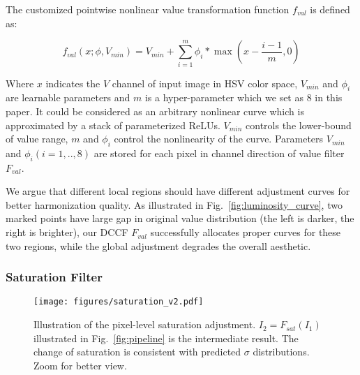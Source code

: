 \documentclass[runningheads]{llncs}
\begin{document}
    
    The customized pointwise nonlinear value transformation function $f_{val}$ is defined as:
     
    \begin{equation} \label{eq:f_lum}
        f_{val}(x;\phi,V_{min}) = V_{min} + \sum_{i=1}^{m} \phi_i * \max(x - \frac{i-1}{m}, 0)
    \end{equation}
    
    Where $x$ indicates the $V$ channel of input image in HSV color space,  $V_{min}$ and $\phi_i$ are learnable parameters and $m$ is a hyper-parameter which we set as 8 in this paper.
    It could be considered as an arbitrary nonlinear curve which is approximated by a stack of parameterized ReLUs.
    $V_{min}$ controls the lower-bound of value range, $m$ and $\phi_i$ control the nonlinearity of the curve.
    Parameters $V_{min}$ and $\phi_i (i=1,..,8)$ are stored for each pixel in channel direction of value filter $F_{val}$.
    


    We argue that different local regions should have different adjustment curves for better harmonization quality.
    As illustrated in Fig.~\ref{fig:luminosity_curve}, two marked points have large gap in original value distribution (the left is darker, the right is brighter), our DCCF $F_{val}$ successfully allocates proper curves for these two regions, while the global adjustment degrades the overall aesthetic.
    


    
\subsubsection{Saturation Filter} 
    
    \begin{figure}[!thb]
        \centering
        \vspace{-30pt}
        \texttt{[image: figures/saturation\_v2.pdf]}\\
        \caption{
            \small Illustration of the pixel-level saturation adjustment. 
            $I_2=F_{sat}(I_1)$ illustrated in Fig.~\ref{fig:pipeline} is the intermediate result. The change of saturation is consistent with predicted $\sigma$ distributions. Zoom for better view.
            }
        \vspace{-15pt}
        \label{fig:saturation_map}
    \end{figure}
    
    
\end{document}
